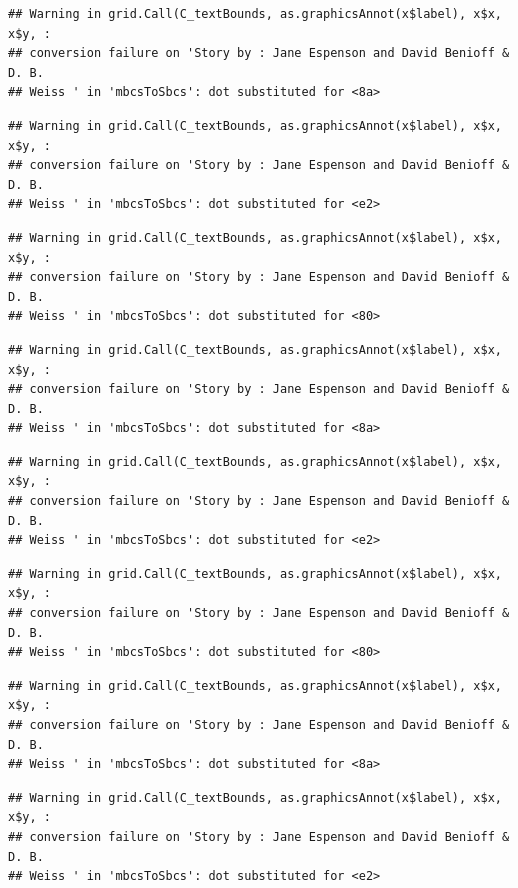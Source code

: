 \documentclass[]{article}
\begin{document}
\begin{verbatim}
## Warning in grid.Call(C_textBounds, as.graphicsAnnot(x$label), x$x, x$y, :
## conversion failure on 'Story by : Jane Espenson and David Benioff & D. B.
## Weiss ' in 'mbcsToSbcs': dot substituted for <8a>
\end{verbatim}

\begin{verbatim}
## Warning in grid.Call(C_textBounds, as.graphicsAnnot(x$label), x$x, x$y, :
## conversion failure on 'Story by : Jane Espenson and David Benioff & D. B.
## Weiss ' in 'mbcsToSbcs': dot substituted for <e2>
\end{verbatim}

\begin{verbatim}
## Warning in grid.Call(C_textBounds, as.graphicsAnnot(x$label), x$x, x$y, :
## conversion failure on 'Story by : Jane Espenson and David Benioff & D. B.
## Weiss ' in 'mbcsToSbcs': dot substituted for <80>
\end{verbatim}

\begin{verbatim}
## Warning in grid.Call(C_textBounds, as.graphicsAnnot(x$label), x$x, x$y, :
## conversion failure on 'Story by : Jane Espenson and David Benioff & D. B.
## Weiss ' in 'mbcsToSbcs': dot substituted for <8a>
\end{verbatim}

\begin{verbatim}
## Warning in grid.Call(C_textBounds, as.graphicsAnnot(x$label), x$x, x$y, :
## conversion failure on 'Story by : Jane Espenson and David Benioff & D. B.
## Weiss ' in 'mbcsToSbcs': dot substituted for <e2>
\end{verbatim}

\begin{verbatim}
## Warning in grid.Call(C_textBounds, as.graphicsAnnot(x$label), x$x, x$y, :
## conversion failure on 'Story by : Jane Espenson and David Benioff & D. B.
## Weiss ' in 'mbcsToSbcs': dot substituted for <80>
\end{verbatim}

\begin{verbatim}
## Warning in grid.Call(C_textBounds, as.graphicsAnnot(x$label), x$x, x$y, :
## conversion failure on 'Story by : Jane Espenson and David Benioff & D. B.
## Weiss ' in 'mbcsToSbcs': dot substituted for <8a>
\end{verbatim}

\begin{verbatim}
## Warning in grid.Call(C_textBounds, as.graphicsAnnot(x$label), x$x, x$y, :
## conversion failure on 'Story by : Jane Espenson and David Benioff & D. B.
## Weiss ' in 'mbcsToSbcs': dot substituted for <e2>
\end{verbatim}
\end{document}
